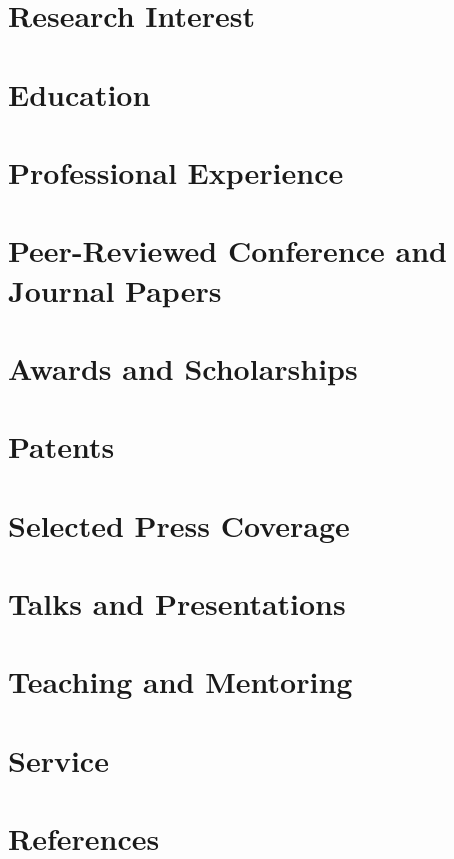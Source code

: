 \documentclass{chencv}
\affiliation{University of California, Los Angeles}
\begin{document}
\makecvtitle

\section{Research Interest}


\section{Education}


\section{Professional Experience}


\section{Peer-Reviewed Conference and Journal Papers}


\section{Awards and Scholarships}


\section{Patents}


\section{Selected Press Coverage}


\section{Talks and Presentations}


\section{Teaching and Mentoring}


\section{Service}


\section{References}

\end{document}
